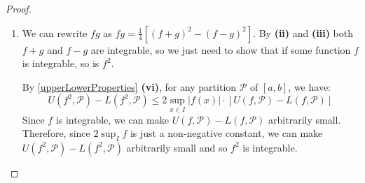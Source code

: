\documentclass[../main.tex]{subfiles}
\begin{document}
\begin{proof}
\begin{enumerate}
      \begin{align*}
        - \int_{a}^{b} |f(x)| \d{x} \leq \int_{a}^{b} f(x) \d{x} \leq \int_{a}^{b} |f(x)| \d{x} \implies \abs{\int_{a}^{b} |f(x)| \d{x}} \geq \abs{\int_{a}^{b} f(x) \d{x}}
      \end{align*}
      $|f| \geq 0\ \forall x \implies \int_{a}^{b} |f| \d{x} \geq 0 \implies |\int_{a}^{b} |f| \d{x}| = \int_{a}^{b} |f| \d{x}$ so the result follows.
    \item We can rewrite $fg$ as $fg = \frac{1}{4}\left[(f + g)^2 - (f - g)^2\right]$.
      By \textbf{(ii)} and \textbf{(iii)} both $f + g$ and $f - g$ are integrable, so we just need to show that if some function $f$ is integrable, so is $f^2$.

      By \cref{upperLowerProperties} \textbf{(vi)}, for any partition $\mathcal{P}$ of $[a, b]$, we have:
      \[
        U(f^2 , \mathcal{P}) - L(f^2, \mathcal{P}) \leq 2 \sup_{x \in I} |f(x)| \cdot [U(f, \mathcal{P}) - L(f, \mathcal{P})]
      \]
      Since $f$ is integrable, we can make $U(f, \mathcal{P}) - L(f, \mathcal{P})$ arbitrarily small.
      Therefore, since $2 \sup_{I} f$ is just a non-negative constant, we can make $U(f^2, \mathcal{P}) - L(f^2, \mathcal{P})$ arbitrarily small and so $f^2$ is integrable.
  \end{enumerate}
\end{proof}
\end{document}
